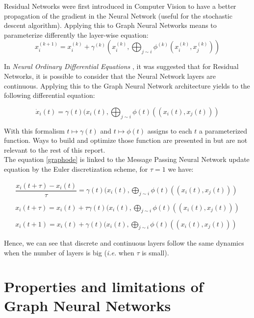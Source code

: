 \documentclass[12pt]{article}
\begin{document}
Residual Networks  were first introduced in Computer Vision to have a better propagation of the gradient in the Neural Network (useful for the stochastic descent algorithm). Applying this to Graph Neural Networks means to parameterize differently the layer-wise equation:
$$
        x_i^{(k+1)} = x_i^{(k)} +\gamma^{(k)}(x_i^{(k)}, \bigoplus_{j \sim i} \phi^{(k)} (x_i^{(k)}, x_j^{(k)}))
$$

In \textit{Neural Ordinary Differential Equations }, it was suggested that for Residual Networks, it is possible to consider that the Neural Network layers are continuous. Applying this to the Graph Neural Network architecture yields to the following differential equation:


\begin{equation}\label{graphode}
    \dot{x}_i(t) = \gamma(t)(x_i(t), \bigoplus_{j \sim i} \phi(t)( (x_i(t), x_j(t)))
\end{equation}

With this formalism $t \mapsto \gamma(t)$ and $t \mapsto \phi(t)$ assigns to each $t$ a parameterized function. Ways to build and optimize those function are presented in  but are not relevant to the rest of this report.\\

The equation \ref{graphode} is linked to the Message Passing Neural Network update equation by the Euler discretization scheme, for $\tau = 1$ we have:

\begin{align*}
    \dfrac{x_i(t+\tau) - x_i(t)}{\tau} = \gamma(t)(x_i(t), \bigoplus_{j \sim i} \phi(t)( (x_i(t), x_j(t))) \\\\
    x_i(t+\tau) = x_i(t) + \tau \gamma(t)(x_i(t), \bigoplus_{j \sim i} \phi(t)( (x_i(t), x_j(t)))\\\\
    x_i(t+1) = x_i(t) + \gamma(t)(x_i(t), \bigoplus_{j \sim i} \phi(t)( (x_i(t), x_j(t)))
\end{align*}

Hence, we can see that discrete and continuous layers follow the same dynamics when the number of layers is big (\textit{i.e.} when $\tau$ is small).


\newpage
\section{Properties and limitations of Graph Neural Networks}
\end{document}
